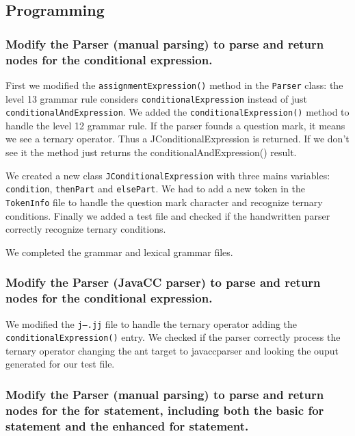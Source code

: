 \documentclass[a4paper, 12pt]{article}
\begin{document}
    \subsection{Programming}
    
        \subsubsection{Modify the Parser (manual parsing) to parse and return nodes for the conditional expression.}
        
            First we modified the \texttt{assignmentExpression()} method in the \texttt{Parser} class: the level 13 grammar rule considers \texttt{conditionalExpression} instead of just \texttt{conditionalAndExpression}. We added the \texttt{conditionalExpression()} method to handle the level 12 grammar rule. If the parser founds a question mark, it means we see a ternary operator. Thus a JConditionalExpression is returned. If we don't see it the method just returns the conditionalAndExpression() result. 
            
            We created a new class \texttt{JConditionalExpression} with three mains variables: \texttt{condition}, \texttt{thenPart} and \texttt{elsePart}. We had to add a new token in the \texttt{TokenInfo} file to handle the question mark character and recognize ternary conditions. Finally we added a test file and checked if the handwritten parser correctly recognize ternary conditions.
            
            We completed the grammar and lexical grammar files.
            
        \subsubsection{Modify the Parser (JavaCC parser) to parse and return nodes for the conditional expression.}
        
        We modified the \texttt{j--.jj} file to handle the ternary operator adding the \texttt{conditionalExpression()} entry. We checked if the parser correctly process the ternary operator changing the ant target to javaccparser and looking the ouput generated for our test file.
        
        \subsubsection{Modify the Parser (manual parsing) to parse and return nodes for the for statement, including both the basic for statement and the enhanced for statement.}
        
\end{document}
